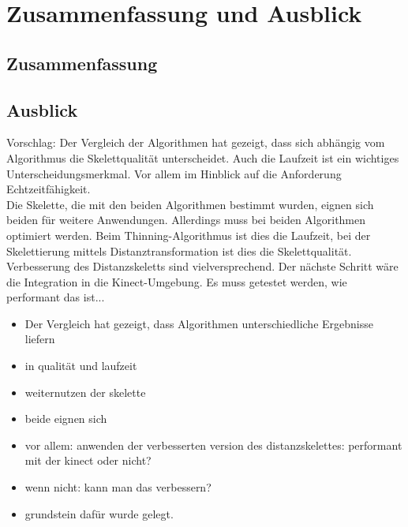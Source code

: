 \chapter{Zusammenfassung und Ausblick}
\label{ch:ausblick}
\section{Zusammenfassung}
\section{Ausblick}
Vorschlag: Der Vergleich der Algorithmen hat gezeigt, dass sich abhängig vom Algorithmus die Skelettqualität unterscheidet. Auch die 
Laufzeit ist ein wichtiges Unterscheidungsmerkmal. Vor allem im Hinblick auf die Anforderung Echtzeitfähigkeit.\\
Die Skelette, die mit den beiden Algorithmen bestimmt wurden, eignen sich beiden für weitere Anwendungen. Allerdings muss bei beiden Algorithmen optimiert werden. Beim Thinning-Algorithmus ist dies die Laufzeit, bei der Skelettierung mittels Distanztransformation ist dies die Skelettqualität. Verbesserung des Distanzskeletts sind vielversprechend. Der nächste Schritt wäre die Integration in die Kinect-Umgebung. Es muss
getestet werden, wie performant das ist...\\
\begin{itemize}
\item Der Vergleich hat gezeigt, dass Algorithmen unterschiedliche Ergebnisse liefern
\item in qualität und laufzeit
\item weiternutzen der skelette
\item beide eignen sich
\item vor allem: anwenden der verbesserten version des distanzskelettes: performant mit der kinect oder nicht?
\item wenn nicht: kann man das verbessern?
\item grundstein dafür wurde gelegt. 
\end{itemize}
